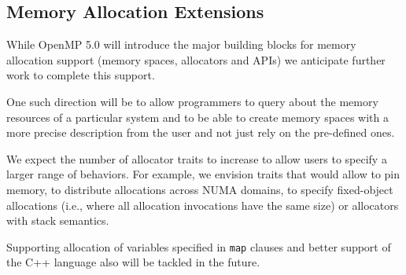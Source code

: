 \subsection{Memory Allocation Extensions}

While OpenMP 5.0 will introduce the major building blocks for memory allocation support (memory spaces, allocators and APIs) we anticipate further work to complete this support. 

One such direction will be to allow programmers to query about the memory resources of a particular system and to be able to create memory spaces with a more precise description from the user and not just rely on the pre-defined ones.

We expect the number of allocator traits to increase to allow users to specify a larger range of behaviors. For example, we envision traits that would allow to pin memory, to distribute allocations across NUMA domains, to specify fixed-object allocations (i.e., where all allocation invocations have the same size) or allocators with stack semantics.

Supporting allocation of variables specified in \texttt{map} clauses and better support of the C++ language also will be tackled in the future.

 